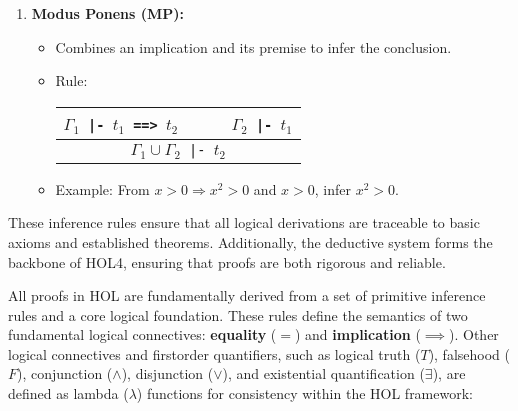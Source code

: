 \begin{enumerate}
    \item \textbf{Modus Ponens (MP):}
    \begin{itemize}
        \item Combines an implication and its premise to infer the conclusion.
        \item Rule:
          \begin{center}
            \begin{tabular}{c}
              $\Gamma_1${\small\verb+ |- +}$t_1${\small\verb+ ==> +}$t_2$ {\small\verb+     +} $\Gamma_2${\small\verb+ |- +}$t_1$ \\
              \hline
              $\Gamma_1 \cup \Gamma_2${\small\verb+ |- +}$t_2$ \\
            \end{tabular}
          \end{center}
        \item Example: From $x > 0 \Rightarrow x^2 > 0$ and $x > 0$, infer $x^2 > 0$.
    \end{itemize}
\end{enumerate}
These inference rules ensure that all logical derivations are traceable to basic axioms and established theorems. Additionally, the deductive system forms the backbone of HOL4, ensuring that proofs are both rigorous and reliable.

All proofs in HOL are fundamentally derived from a set of primitive inference rules and a core logical foundation. These rules define the semantics of two fundamental logical connectives: \textbf{equality} ($=$) and \textbf{implication} ($\implies$). Other logical connectives and first\-order quantifiers, such as logical truth ($T$), falsehood ($F$), conjunction ($\wedge$), disjunction ($\vee$), and existential quantification ($\exists$), are defined as lambda ($\lambda$) functions for consistency within the HOL framework:

